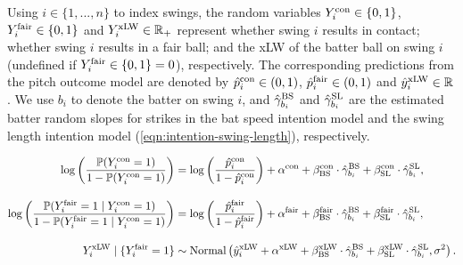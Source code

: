 \documentclass[
  12pt]{article}
\begin{document}
      Using $i \in \{1, ..., n\}$ to index swings, the random variables $Y_i^{\mbox{\scriptsize con}} \in \{0, 1\}$, $Y_i^{\mbox{\scriptsize fair}} \in \{0, 1\}$ and $Y_i^{\mbox{\scriptsize xLW}} \in \mathbb{R}_+$ represent whether swing $i$ results in contact; whether swing $i$ results in a fair ball; and the xLW of the batter ball on swing $i$ (undefined if $Y_i^{\mbox{\scriptsize fair}} \in \{0, 1\} = 0$), respectively. The corresponding predictions from the pitch outcome model are denoted by $\hat p_i^{\mbox{\scriptsize con}} \in (0, 1)$,  $\hat p_i^{\mbox{\scriptsize fair}} \in (0, 1)$ and $\hat y_i^{\mbox{\scriptsize xLW}} \in \mathbb{R}$. We use $b_i$ to denote the batter on swing $i$, and $\hat\gamma_{b_i}^{\mbox{\scriptsize BS}}$ and $\hat\gamma_{b_i}^{\mbox{\scriptsize SL}}$ are the estimated batter random slopes for strikes in the bat speed intention model and the swing length intention model (\ref{eqn:intention-swing-length}), respectively.

      \begin{align}
        \label{eqn:causal-contact}
        \log \left(
          \frac{\mathbb{P}(Y_i^{\mbox{\scriptsize con}} = 1)}{1 - \mathbb{P}(Y_i^{\mbox{\scriptsize con}} = 1)}
        \right) &= \log \left(
          \frac{\hat p_i^{\mbox{\scriptsize con}}}{1 - \hat p_i^{\mbox{\scriptsize con}}}
        \right) +
          \alpha^{\mbox{\scriptsize con}} +
          \beta_{\mbox{\scriptsize BS}}^{\mbox{\scriptsize con}} \cdot
            \hat\gamma_{b_i}^{\mbox{\scriptsize BS}} +
          \beta_{\mbox{\scriptsize SL}}^{\mbox{\scriptsize con}} \cdot
            \hat\gamma_{b_i}^{\mbox{\scriptsize SL}},\\[10pt]
        \label{eqn:causal-fair}
        \log \left(
          \frac{
            \mathbb{P}(Y_i^{\mbox{\scriptsize fair}} = 1 \mid Y_i^{\mbox{\scriptsize con}} = 1)
          }{
            1 - \mathbb{P}(Y_i^{\mbox{\scriptsize fair}} = 1 \mid Y_i^{\mbox{\scriptsize con}} = 1)
          }
        \right) &= \log \left(
          \frac{\hat p_i^{\mbox{\scriptsize fair}}}{1 - \hat p_i^{\mbox{\scriptsize fair}}}
        \right) +
          \alpha^{\mbox{\scriptsize fair}} +
          \beta_{\mbox{\scriptsize BS}}^{\mbox{\scriptsize fair}} \cdot
            \hat\gamma_{b_i}^{\mbox{\scriptsize BS}} +
          \beta_{\mbox{\scriptsize SL}}^{\mbox{\scriptsize fair}} \cdot
            \hat\gamma_{b_i}^{\mbox{\scriptsize SL}},\\[10pt]
        \label{eqn:causal-hit}
        Y_i^{\mbox{\scriptsize xLW}} \mid \{Y_i^{\mbox{\scriptsize fair}} = 1\} &\sim
          \mbox{Normal}\left(
            \hat y_i^{\mbox{\scriptsize xLW}} +
              \alpha^{\mbox{\scriptsize xLW}} +
              \beta_{\mbox{\scriptsize BS}}^{\mbox{\scriptsize xLW}} \cdot
                \hat\gamma_{b_i}^{\mbox{\scriptsize BS}} +
              \beta_{\mbox{\scriptsize SL}}^{\mbox{\scriptsize xLW}} \cdot
                \hat\gamma_{b_i}^{\mbox{\scriptsize SL}},
            \sigma^2
          \right).
      \end{align}
\end{document}
